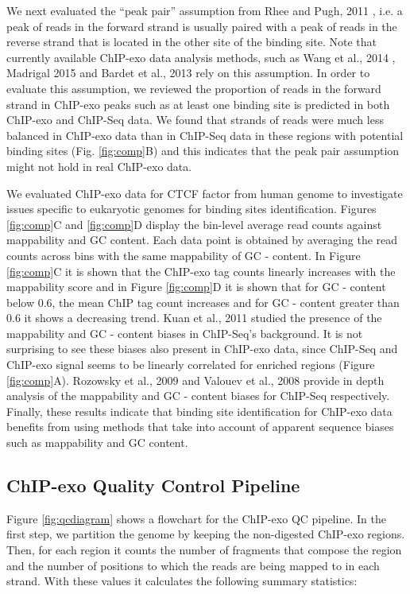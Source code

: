 \documentclass{bmcart}\usepackage[]{graphicx}\usepackage[]{color}
\begin{document}
We next evaluated the ``peak pair'' assumption from Rhee and Pugh,
2011 \cite{exo1}, i.e. a peak of reads in the forward strand is
usually paired with a peak of reads in the reverse strand that is
located in the other site of the binding site. Note that currently
available ChIP-exo data analysis methods, such as Wang et al., 2014
\cite{mace}, Madrigal 2015 \cite{cexor} and Bardet et al., 2013
\cite{peakzilla} rely on this assumption. In order to evaluate this
assumption, we reviewed the proportion of reads in the forward strand
in ChIP-exo peaks such as at least one binding site is predicted in
both ChIP-exo and ChIP-Seq data. We found that strands of reads were
much less balanced in ChIP-exo data than in ChIP-Seq data in these
regions with potential binding sites (Fig. \ref{fig:comp}B) and this
indicates that the peak pair assumption might not hold in real
ChIP-exo data.

We evaluated ChIP-exo data for CTCF factor from human genome
\cite{exo1} to investigate issues specific to eukaryotic genomes for
binding sites identification. Figures \ref{fig:comp}C and
\ref{fig:comp}D display the bin-level average read counts against
mappability and GC content. Each data point is obtained by averaging
the read counts across bins with the same mappability of GC -
content. In Figure \ref{fig:comp}C it is shown that the ChIP-exo tag
counts linearly increases with the mappability score and in Figure
\ref{fig:comp}D it is shown that for GC - content below 0.6, the mean
ChIP tag count increases and for GC - content greater than 0.6 it
shows a decreasing trend. Kuan et al., 2011 \cite{mosaics} studied the
presence of the mappability and GC - content biases in ChIP-Seq's
background. It is not surprising to see these biases also present in
ChIP-exo data, since ChIP-Seq and ChIP-exo signal seems to be linearly
correlated for enriched regions (Figure \ref{fig:comp}A). Rozowsky et
al., 2009 \cite{peakseq} and Valouev et al., 2008 \cite{quest} provide
in depth analysis of the mappability and GC - content biases for
ChIP-Seq respectively. Finally, these results indicate that binding
site identification for ChIP-exo data benefits from using methods that
take into account of apparent sequence biases such as mappability and
GC content.

\subsection{ChIP-exo Quality Control Pipeline}

Figure \ref{fig:qcdiagram} shows a flowchart for the ChIP-exo QC
pipeline. In the first step, we partition the genome by keeping the
non-digested ChIP-exo regions. Then, for each region it counts the
number of fragments that compose the region and the number of
positions to which the reads are being mapped to in each strand. With
these values it calculates the following summary statistics:
\end{document}
